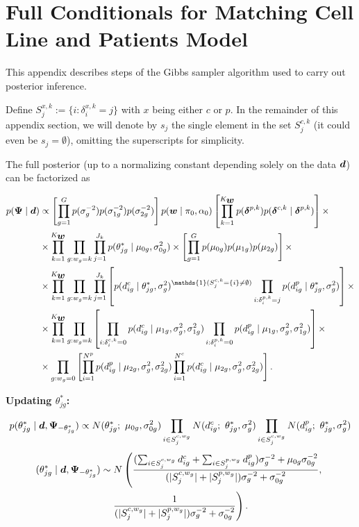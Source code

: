 \section{Full Conditionals for Matching Cell Line and Patients Model}
\label{sec:full_cond_2}
\vspace{0.3 cm}

This appendix describes steps of the Gibbs sampler algorithm used to carry out posterior inference.

Define $S^{x,k}_j:=\{i:\delta^{x,k}_i=j\}$ with $x$ being either $c$ or $p$. In the remainder of this appendix section, we will denote by $s_j$ the single element in the set $S^{c,k}_j$ (it could even be $s_j=\emptyset$), omitting the superscripts for simplicity.

The full posterior (up to a normalizing constant depending solely on the data $\mbox{\boldmath $d$}$) can be factorized as 

\begin{align}
p(\bfPsi \mid \bfd) &\propto \left[\prod^G_{g=1} p(\sigma^{-2}_g) p(\sigma^{-2}_{1g}) p(\sigma^{-2}_{2g})\right] p(\bfw \mid \pi_0, \alpha_0) \left[\prod^{K_{\bfw}}_{k=1} p(\bfdelta^{p,k})p(\bfdelta^{c,k}\mid \bfdelta^{p,k})\right]\times \nonumber\\
&\times\prod^{K_{\bfw}}_{k=1} \prod_{g:w_g=k}\prod^{J_k}_{j=1}p(\theta^*_{jg} \mid \mu_{0g}, \sigma^2_{0g})\times\left[\prod_{g=1}^G p(\mu_{0g})p(\mu_{1g})p(\mu_{2g})\right]\times\nonumber\\
&\times\prod^{K_{\bfw}}_{k=1} \prod_{g:w_g=k}\prod^{J_k}_{j=1}\left[ p(d^c_{ig}\mid \theta^*_{jg}, \sigma^2_g)^{\mathds{1}(S^{c,k}_j=\{i\}\neq \emptyset)}\prod_{i: \delta^{p,k}_i=j}p(d^p_{ig}\mid \theta^*_{jg}, \sigma^2_g)\right]\times\nonumber\\
&\times\prod^{K_{\bfw}}_{k=1} \prod_{g:w_g=k}\left[ \prod_{i: \delta^{c,k}_i=0}p(d^c_{ig}\mid \mu_{1g}, \sigma^2_g, \sigma^2_{1g})\prod_{i: \delta^{p,k}_i=0}p(d^p_{ig}\mid \mu_{1g}, \sigma^2_g, \sigma^2_{1g})\right]\times\nonumber\\
&\times\prod_{g:w_g=0}\left[\prod^{N^p}_{i=1} p(d^p_{ig} \mid \mu_{2g}, \sigma^2_{g}, \sigma^2_{2g}) \prod^{N^c}_{i=1} p(d^c_{ig} \mid \mu_{2g}, \sigma^2_{g}, \sigma^2_{2g})\right].
\label{eq:full_posterior}
\end{align}

\textbf{Updating $\theta^*_{jg}$:}

\begin{equation*}
p(\theta^*_{jg} \mid \mbox{\boldmath $d$}, \mbox{\boldmath $\Psi$}_{-\theta^*_{jg}}) \propto N(\theta^*_{jg}; \ \mu_{0g}, \sigma^2_{0g})\prod_{i\in S^{c,w_g}_j}N(d^c_{ig};\ \theta^*_{jg}, \sigma^2_g) \prod_{i\in S^{c,w_g}_j} N(d^p_{ig}; \ \theta^*_{jg}, \sigma^2_g)
\end{equation*}
\begin{multline*}
(\theta^*_{jg} \mid \mbox{\boldmath $d$}, \mbox{\boldmath $\Psi$}_{-\theta^*_{jg}}) \sim N\left( \frac{(\sum_{i \in S^{c,w_g}_j}d^c_{ig} + \sum_{i \in S^{p,w_g}_j}d^p_{ig})\sigma^{-2}_g + \mu_{0g}\sigma^{-2}_{0g}}{(|S^{c,w_g}_j| + |S^{p,w_g}_j|)\sigma^{-2}_g + \sigma^{-2}_{0g}}, \right. \\ 
\left.\frac{1}{(|S^{c,w_g}_j| + |S^{p,w_g}_j|)\sigma^{-2}_g + \sigma^{-2}_{0g}}\right).
\end{multline*}

